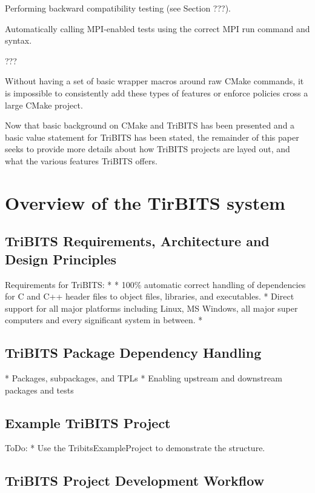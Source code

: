 \documentclass[10pt]{article}
\begin{document}
\begin{compactitem}
\item Performing backward compatibility testing (see Section ???).
\item Automatically calling MPI-enabled tests using the correct MPI run command and syntax.
\item ???
\end{compactitem}

Without having a set of basic wrapper macros around raw CMake commands, it is impossible to consistently add these types of features or enforce policies cross a large CMake project.

Now that basic background on CMake and TriBITS has been presented and a basic value statement for TriBITS has been stated, the remainder of this paper seeks to provide more details about how TriBITS projects are layed out, and what the various features TriBITS offers.

%
\section{Overview of the TirBITS system}
%

%
\subsection{TriBITS Requirements, Architecture and Design Principles}
%

Requirements for TriBITS:
* 
* 100\% automatic correct handling of dependencies for C and C++ header files to object files, libraries, and executables.
* Direct support for all major platforms including Linux, MS Windows,  all major super computers and every significant system in between.
* 

%
\subsection{TriBITS Package Dependency Handling}
%

* Packages, subpackages, and TPLs
* Enabling upstream and downstream packages and tests

%
\subsection{Example TriBITS Project}
%

ToDo:
* Use the TribitsExampleProject to demonstrate the structure.


%
\subsection{TriBITS Project Development Workflow}
%
\end{document}
